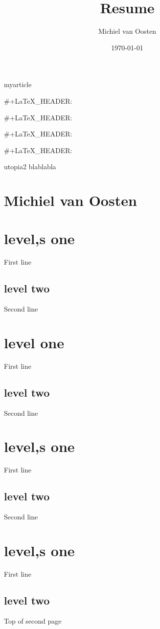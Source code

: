 \documentclass[a4paper,12pt]{article}
\title{Resume}
\author{Michiel van Oosten}
\date{\today}
\begin{document}
\maketitle

myarticle 

#+LaTeX_HEADER: \usepackage[T1]{fontenc} 
#+LaTeX_HEADER: \usepackage[adobe-utopia]{mathdesign}
#+LaTeX_HEADER: \usepackage[scaled]{berasans} 
#+LaTeX_HEADER: \usepackage[scaled]{beramono}

utopia2
blablabla
\section*{Michiel van Oosten}
\label{sec-1}
\section*{level,s one}
\label{sec-2}


First line
\subsection*{level two}
\label{sec-2-1}


Second line
\section*{level one}
\label{sec-3}


First line
\subsection*{level two}
\label{sec-3-1}


Second line
\section*{level,s one}
\label{sec-4}


First line
\subsection*{level two}
\label{sec-4-1}


Second line
\section*{level,s one}
\label{sec-5}


First line
\subsection*{level two}
\label{sec-5-1}


Top of second page
\end{document}
